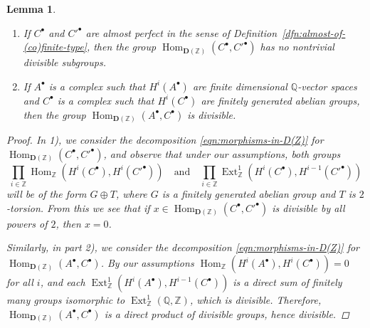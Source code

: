 \documentclass[leqno,12pt]{article}
\theoremstyle{plain}
\newtheorem{lemma}[theorem]{\indent\sc Lemma}
\theoremstyle{definition}
\DeclareMathOperator{\Hom}{Hom}
\DeclareMathOperator{\Ext}{Ext}
\newcommand{\ZZ}{\mathbb{Z}}
\newcommand{\QQ}{\mathbb{Q}}
\begin{document}
\begin{lemma}
  \label{lemma:morphisms-inDAb-not-divisible}
  ~

  \begin{enumerate}
  \item[$1)$] If $C^\bullet$ and $C'^\bullet$ are almost perfect in the sense of
    Definition~{\rm\ref{dfn:almost-of-(co)finite-type}}, then the group
    $\Hom_{\mathbf{D} (\ZZ)} (C^\bullet, C'^\bullet)$ has no nontrivial
    divisible subgroups.

  \item[$2)$] If $A^\bullet$ is a complex such that $H^i (A^\bullet)$ are finite
    dimensional $\QQ$-vector spaces and $C^\bullet$ is a complex such that
    $H^i (C^\bullet)$ are finitely generated abelian groups, then the group
    $\Hom_{\mathbf{D} (\ZZ)} (A^\bullet, C^\bullet)$ is divisible.
  \end{enumerate}

  \begin{proof}
    In 1), we consider the decomposition \eqref{eqn:morphisms-in-D(Z)} for
    $\Hom_{\mathbf{D} (\ZZ)} (C^\bullet, C'^\bullet)$, and observe that under
    our assumptions, both groups
    \[ \prod_{i\in\ZZ} \Hom_\ZZ (H^i (C^\bullet), H^i (C'^\bullet))
      \quad\text{and}\quad
      \prod_{i\in\ZZ} \Ext_\ZZ^1 (H^i (C^\bullet), H^{i-1} (C'^\bullet))\]
    will be of the form $G \oplus T$, where $G$ is a finitely generated abelian
    group and $T$ is $2$-torsion. From this we see that if
    $x \in \Hom_{\mathbf{D} (\ZZ)} (C^\bullet, C'^\bullet)$ is divisible by all
    powers of $2$, then $x = 0$.

    Similarly, in part 2), we consider the decomposition
    \eqref{eqn:morphisms-in-D(Z)} for
    $\Hom_{\mathbf{D} (\ZZ)} (A^\bullet, C^\bullet)$. By our assumptions
    $\Hom_\ZZ (H^i (A^\bullet), H^i (C^\bullet)) = 0$ for all $i$, and each
    $\Ext_\ZZ^1 (H^i (A^\bullet), H^{i-1} (C^\bullet))$ is a direct sum of
    finitely many groups isomorphic to $\Ext_\ZZ^1 (\QQ,\ZZ)$, which is
    divisible. Therefore, $\Hom_{\mathbf{D} (\ZZ)} (A^\bullet, C^\bullet)$ is
    a direct product of divisible groups, hence divisible.
  \end{proof}
\end{lemma}
\end{document}

